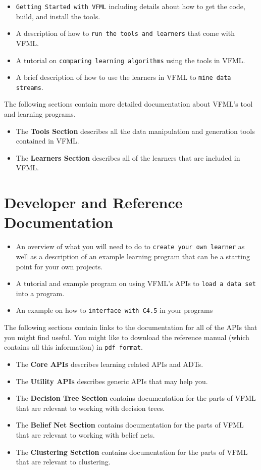 \begin{itemize}
\item {\tt Getting Started with VFML} including details about how to get the code, build, and install the tools. \item A description of how to {\tt run the tools and learners} that come with VFML. \item A tutorial on {\tt comparing learning algorithms} using the tools in VFML. \item A brief description of how to use the learners in VFML to {\tt mine data streams}. \end{itemize}


The following sections contain more detailed documentation about VFML's tool and learning programs.

\begin{itemize}
\item The {\bf Tools Section} describes all the data manipulation and generation tools contained in VFML.\item The {\bf Learners Section} describes all of the learners that are included in VFML.\end{itemize}
\section{Developer and Reference Documentation}\label{details}
\begin{itemize}
\item An overview of what you will need to do to {\tt create your own learner} as well as a description of an example learning program that can be a starting point for your own projects. \item A tutorial and example program on using VFML's APIs to {\tt load a data set} into a program. \item An example on how to {\tt interface with C4.5} in your programs \end{itemize}


The following sections contain links to the documentation for all of the APIs that you might find useful. You might like to download the reference manual (which contains all this information) in {\tt pdf format}.

\begin{itemize}
\item The {\bf Core APIs} describes learning related APIs and ADTs.\item The {\bf Utility APIs} describes generic APIs that may help you.\item The {\bf Decision Tree Section} contains documentation for the parts of VFML that are relevant to working with decision trees.\item The {\bf Belief Net Section} contains documentation for the parts of VFML that are relevant to working with belief nets.\item The {\bf Clustering Setction} contains documentation for the parts of VFML that are relevant to clustering.\end{itemize}
